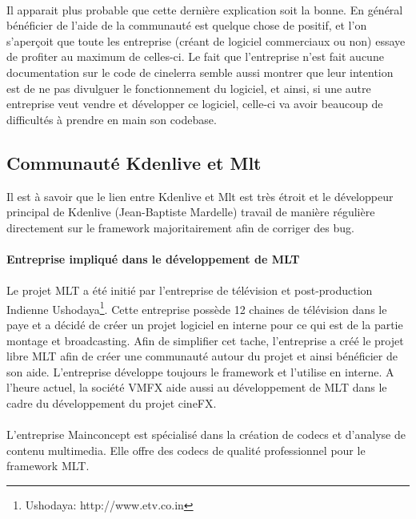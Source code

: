 \paragraph{}

Il apparait plus probable que cette dernière explication soit
la bonne.  En général bénéficier de l'aide de la communauté est
quelque chose de positif, et l'on s'aperçoit que toute les entreprise
(créant de logiciel commerciaux ou non) essaye de profiter au maximum
de celles-ci.  Le fait que l'entreprise n'est fait aucune documentation
sur le code de cinelerra semble aussi montrer que leur intention est de
ne pas divulguer le fonctionnement du logiciel, et ainsi, si une autre
entreprise veut vendre et développer ce logiciel, celle-ci va avoir
beaucoup de difficultés à prendre en main son codebase.

\subsection {Communauté Kdenlive et Mlt}

Il est à savoir que le lien entre Kdenlive et Mlt est très étroit et
le développeur principal de Kdenlive (Jean-Baptiste Mardelle) travail
de manière régulière directement sur le framework majoritairement
afin de corriger des bug.

\paragraph{Entreprise impliqué dans le développement de MLT}

\paragraph{}

Le projet MLT a été initié par l'entreprise de
télévision et post-production Indienne Ushodaya\footnote{Ushodaya:
http://www.etv.co.in}. Cette entreprise possède 12 chaines de
télévision dans le paye et a décidé de créer un projet logiciel en
interne pour ce qui est de la partie montage et broadcasting. Afin de
simplifier cet tache, l'entreprise a créé le projet libre MLT
afin de créer une communauté autour du projet et ainsi bénéficier de
son aide. L'entreprise développe toujours le framework et l'utilise en
interne. A l'heure actuel, la société VMFX aide aussi au développement
de MLT dans le cadre du développement du projet cineFX.

\paragraph{} L'entreprise Mainconcept est spécialisé dans la création
de codecs et d'analyse de contenu multimedia. Elle offre des codecs de
qualité professionnel pour le framework MLT.

